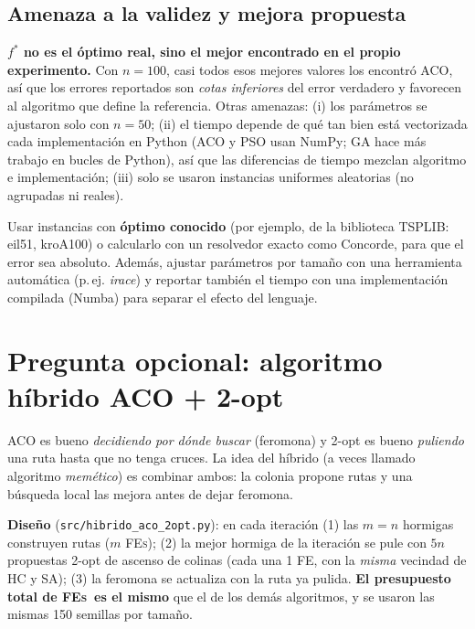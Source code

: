 \documentclass[11pt,a4paper]{article}
\newcommand{\FEs}{\textsc{FEs}}
\newcommand{\archivo}[1]{\texttt{#1}}
\begin{document}
\subsection{Amenaza a la validez y mejora propuesta}
\begin{respuesta}
\textbf{$f^\ast$ no es el óptimo real, sino el mejor encontrado en el propio experimento.} Con $n=100$, casi todos esos mejores valores los encontró ACO, así que los errores reportados
son \emph{cotas inferiores} del error verdadero y favorecen al algoritmo que define la referencia. Otras amenazas: (i) los parámetros se ajustaron solo con $n=50$;
(ii) el tiempo depende de qué tan bien está vectorizada cada implementación en Python (ACO y PSO usan NumPy; GA hace más trabajo en bucles de Python), así que las diferencias de tiempo
mezclan algoritmo e implementación; (iii) solo se usaron instancias uniformes aleatorias (no agrupadas ni reales).
\end{respuesta}
\begin{respuesta}
Usar instancias con \textbf{óptimo conocido} (por ejemplo, de la biblioteca TSPLIB: eil51, kroA100) o calcularlo con un resolvedor exacto como Concorde, para que el error sea absoluto.
Además, ajustar parámetros por tamaño con una herramienta automática (p.\,ej. \emph{irace}) y reportar también el tiempo con una implementación compilada (Numba) para separar el efecto del lenguaje.
\end{respuesta}

\section{Pregunta opcional: algoritmo híbrido ACO + 2-opt}\label{sec:hibrido}
\begin{idea}
ACO es bueno \emph{decidiendo por dónde buscar} (feromona) y 2-opt es bueno \emph{puliendo} una ruta hasta que no tenga cruces. La idea del híbrido (a veces llamado
algoritmo \emph{memético}) es combinar ambos: la colonia propone rutas y una búsqueda local las mejora antes de dejar feromona.
\end{idea}

\textbf{Diseño} (\archivo{src/hibrido\_aco\_2opt.py}): en cada iteración (1) las $m=n$ hormigas construyen rutas ($m$ \FEs); (2) la mejor hormiga de la iteración se pule con
$5n$ propuestas 2-opt de ascenso de colinas (cada una 1 FE, con la \emph{misma} vecindad de HC y SA); (3) la feromona se actualiza con la ruta ya pulida.
\textbf{El presupuesto total de \FEs\ es el mismo} que el de los demás algoritmos, y se usaron las mismas 150 semillas por tamaño.
\end{document}
